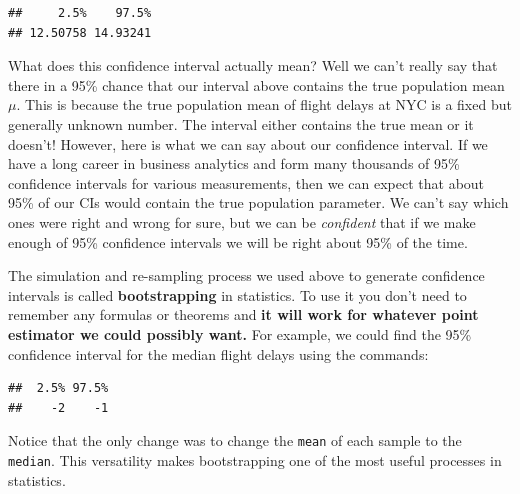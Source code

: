 \documentclass[
]{book}
\newenvironment{Shaded}{\begin{snugshade}}{\end{snugshade}}
\newcommand{\AttributeTok}[1]{\textcolor[rgb]{0.77,0.63,0.00}{#1}}
\newcommand{\ConstantTok}[1]{\textcolor[rgb]{0.00,0.00,0.00}{#1}}
\newcommand{\DecValTok}[1]{\textcolor[rgb]{0.00,0.00,0.81}{#1}}
\newcommand{\FloatTok}[1]{\textcolor[rgb]{0.00,0.00,0.81}{#1}}
\newcommand{\FunctionTok}[1]{\textcolor[rgb]{0.00,0.00,0.00}{#1}}
\newcommand{\NormalTok}[1]{#1}
\newcommand{\OtherTok}[1]{\textcolor[rgb]{0.56,0.35,0.01}{#1}}
\newcommand{\SpecialCharTok}[1]{\textcolor[rgb]{0.00,0.00,0.00}{#1}}
\theoremstyle{definition}
\theoremstyle{definition}
\theoremstyle{definition}
\theoremstyle{definition}
\theoremstyle{remark}
\begin{document}
\begin{verbatim}
##     2.5%    97.5% 
## 12.50758 14.93241
\end{verbatim}

What does this confidence interval actually mean? Well we can't really say that there in a 95\% chance that our interval above contains the true population mean \(\mu\). This is because the true population mean of flight delays at NYC is a fixed but generally unknown number. The interval either contains the true mean or it doesn't! However, here is what we can say about our confidence interval. If we have a long career in business analytics and form many thousands of 95\% confidence intervals for various measurements, then we can expect that about 95\% of our CIs would contain the true population parameter. We can't say which ones were right and wrong for sure, but we can be \emph{confident} that if we make enough of 95\% confidence intervals we will be right about 95\% of the time.

The simulation and re-sampling process we used above to generate confidence intervals is called \textbf{bootstrapping} in statistics. To use it you don't need to remember any formulas or theorems and \textbf{it will work for whatever point estimator we could possibly want.} For example, we could find the 95\% confidence interval for the median flight delays using the commands:

\begin{Shaded}
\end{Shaded}

\begin{verbatim}
##  2.5% 97.5% 
##    -2    -1
\end{verbatim}

Notice that the only change was to change the \texttt{mean} of each sample to the \texttt{median}. This versatility makes bootstrapping one of the most useful processes in statistics.
\end{document}
